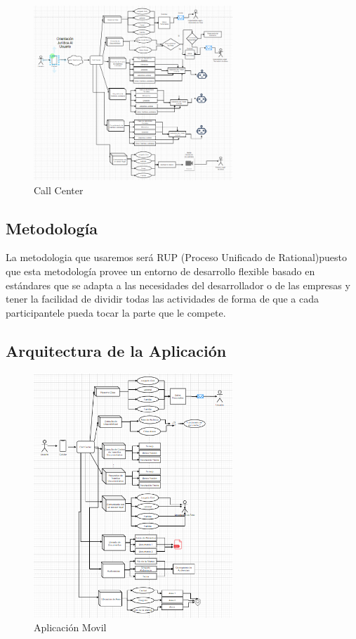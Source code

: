 \documentclass[twoside,twocolumn]{article}
\begin{document}
\begin{figure}[h!]
	\begin{center}
		\includegraphics[width=7.5cm]{./Imagenes/callcenter} 
		\caption{Call Center}
	\end{center}
\end{figure}


\subsection{Metodología}
La metodologia que usaremos será RUP (Proceso Unificado de Rational)puesto que esta metodología provee un entorno de desarrollo flexible basado en estándares que se adapta a las necesidades del desarrollador o de las empresas y tener la facilidad de dividir todas las actividades de forma de que a cada participantele pueda tocar la parte que le compete.

\subsection{Arquitectura de la Aplicación}

\begin{figure}[h!]
	\begin{center}
		\includegraphics[width=7.5cm]{./Imagenes/apk} 
		\caption{Aplicación Movil}
	\end{center}
\end{figure}
\end{document}
